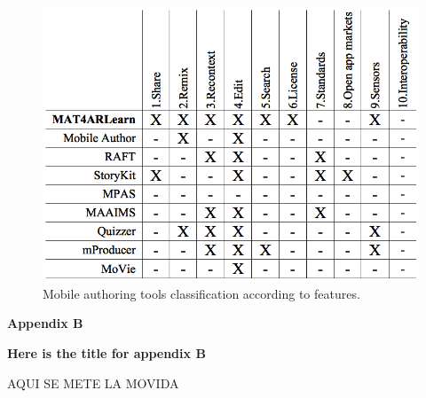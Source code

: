 \begin{small}


\begin{figure}[H]
	\centering
     \includegraphics[width=0.9\linewidth]{img/table3}
	\caption{Mobile authoring tools classification according to features.}
	\label{table3} 
\end{figure}



\end{small}



\clearpage{\pagestyle{empty}\cleardoublepage}

\begin{Large}
\textbf{Appendix B} 
\end{Large}
\vspace{3em}

\textbf{Here is the title for appendix B}

\begin{small}

AQUI SE METE LA MOVIDA

\end{small}



\clearpage{\pagestyle{empty}\cleardoublepage}
